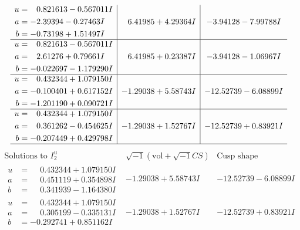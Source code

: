 \documentclass[1p]{elsarticle_modified}
\theoremstyle{definition}
\newcommand{\I}{\sqrt{-1}}
\begin{document}
$$\begin{array}{c|c|c}
\begin{aligned}
u &= \phantom{-}0.821613 - 0.567011 I \\
a &= -2.39394 - 0.27463 I \\
b &= -0.73198 + 1.51497 I\end{aligned}
 & \phantom{-}6.41985 + 4.29364 I & -3.94128 - 7.99788 I \\ \hline\begin{aligned}
u &= \phantom{-}0.821613 - 0.567011 I \\
a &= \phantom{-}2.61276 + 0.79661 I \\
b &= -0.022697 - 1.179290 I\end{aligned}
 & \phantom{-}6.41985 + 0.23387 I & -3.94128 - 1.06967 I \\ \hline\begin{aligned}
u &= \phantom{-}0.432344 + 1.079150 I \\
a &= -0.100401 + 0.617152 I \\
b &= -1.201190 + 0.090721 I\end{aligned}
 & -1.29038 + 5.58743 I & -12.52739 - 6.08899 I \\ \hline\begin{aligned}
u &= \phantom{-}0.432344 + 1.079150 I \\
a &= \phantom{-}0.361262 - 0.454625 I \\
b &= -0.207449 + 0.429798 I\end{aligned}
 & -1.29038 + 1.52767 I & -12.52739 + 0.83921 I\\
 \hline 
 \end{array}$$\newpage$$\begin{array}{c|c|c}  
\text{Solutions to }I^u_{2}& \I (\text{vol} + \sqrt{-1}CS) & \text{Cusp shape}\\
 \hline 
\begin{aligned}
u &= \phantom{-}0.432344 + 1.079150 I \\
a &= \phantom{-}0.451119 + 0.354898 I \\
b &= \phantom{-}0.341939 - 1.164380 I\end{aligned}
 & -1.29038 + 5.58743 I & -12.52739 - 6.08899 I \\ \hline\begin{aligned}
u &= \phantom{-}0.432344 + 1.079150 I \\
a &= \phantom{-}0.305199 - 0.335131 I \\
b &= -0.292741 + 0.851162 I\end{aligned}
 & -1.29038 + 1.52767 I & -12.52739 + 0.83921 I \\ \hline\begin{aligned}

\end{aligned}
\end{array}$$
\end{document}
